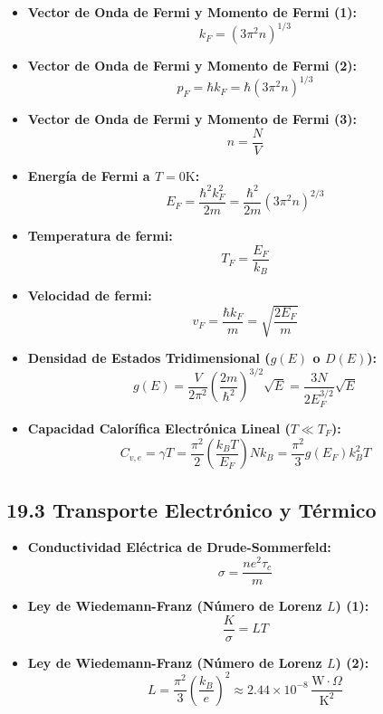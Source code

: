 \documentclass[11pt,a4paper]{article}
\begin{document}
\begin{itemize}
  \item \textbf{Vector de Onda de Fermi y Momento de Fermi (1):}
  \[
    k_F = (3\pi^2 n)^{1/3}
  \]
  \item \textbf{Vector de Onda de Fermi y Momento de Fermi (2):}
  \[
    p_F = \hbar k_F = \hbar (3\pi^2 n)^{1/3}
  \]
  \item \textbf{Vector de Onda de Fermi y Momento de Fermi (3):}
  \[
    n = \frac{N}{V}
  \]
  \item \textbf{Energía de Fermi a $T = 0\mathrm{ K}$:}
  \[
    E_F = \frac{\hbar^2 k_F^2}{2m} = \frac{\hbar^2}{2m}(3\pi^2 n)^{2/3}
  \]
  \item \textbf{Temperatura de fermi:}
  \[
    T_F = \frac{E_F}{k_B}
  \]
  \item \textbf{Velocidad de fermi:}
  \[
    v_F = \frac{\hbar k_F}{m} = \sqrt{\frac{2E_F}{m}}
  \]
  \item \textbf{Densidad de Estados Tridimensional ($g(E)$ o $D(E)$):}
  \[
    g(E) = \frac{V}{2\pi^2}\left( \frac{2m}{\hbar^2} \right)^{3/2} \sqrt{E} = \frac{3N}{2E_F^{3/2}}\sqrt{E}
  \]
  \item \textbf{Capacidad Calorífica Electrónica Lineal ($T \ll T_F$):}
  \[
    C_{v,e} = \gamma T = \frac{\pi^2}{2}\left( \frac{k_B T}{E_F} \right) N k_B = \frac{\pi^2}{3} g(E_F) k_B^2 T
  \]
\end{itemize}

\subsection*{19.3 Transporte Electrónico y Térmico}

\begin{itemize}
  \item \textbf{Conductividad Eléctrica de Drude-Sommerfeld:}
  \[
    \sigma = \frac{n e^2 \tau_c}{m}
  \]
  \item \textbf{Ley de Wiedemann-Franz (Número de Lorenz $L$) (1):}
  \[
    \frac{K}{\sigma} = L T
  \]
  \item \textbf{Ley de Wiedemann-Franz (Número de Lorenz $L$) (2):}
  \[
    L = \frac{\pi^2}{3}\left( \frac{k_B}{e} \right)^2 \approx 2.44 \times 10^{-8} \, \frac{\mathrm{W}\cdot\Omega}{\mathrm{K}^2}
  \]
\end{itemize}
\end{document}
